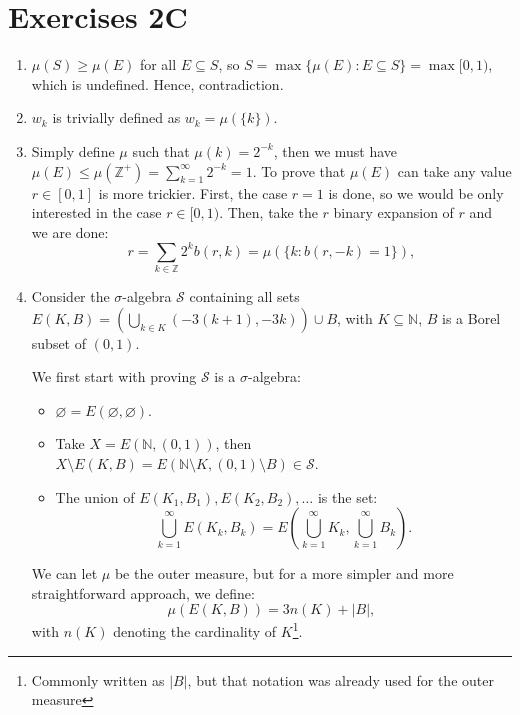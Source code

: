 
\section{Exercises 2C} %
\label{sec:Exercises 2C}


\begin{enumerate}[label=\textbf{2C.\arabic*}]
  \item \( \mu (S) \ge \mu (E) \) for all \( E \subseteq S \), so \( S = \max
    \{\mu (E): E \subseteq S\} = \max [0, 1)  \), which is undefined. Hence,
    contradiction.
  \item \( w_{k} \) is trivially defined as \( w_{k} = \mu (\{k\}  ) \).
  \item \label{2C3} Simply define \( \mu \) such that \( \mu (k) = 2^{-k} \), then we
    must have \( \mu (E) \le \mu (\mathbb{Z}^{+}) = \sum_{k = 1}^{\infty} 2^{-k}
    = 1\). To prove that \( \mu (E) \) can take any value \( r \in [0, 1] \) is
    more trickier. First, the case \( r = 1 \) is done, so we would be only
    interested in the case \( r \in [0, 1) \). Then, take the \( r \) binary
    expansion of \( r \) and we are done:
    \[
      r = \sum_{k \in \mathbb{Z}} 2^{k}b(r, k) = \mu (\{k: b(r, -k) = 1\}  )  
    ,\]
  \item Consider the \( \sigma \)-algebra \( \mathcal{S} \) containing all sets
    \( E(K, B) = \left(   \bigcup_{k \in K} (-3(k + 1), -3k) \right) \cup B \),
    with \( K \subseteq \mathbb{N} \), \( B \) is a Borel subset of \( (0, 1)
    \). 

    We first start with proving \( \mathcal{S} \) is a \( \sigma \)-algebra:
    \begin{itemize}
    \item \( \varnothing = E(\varnothing, \varnothing) \).
    \item Take \( X = E(\mathbb{N}, (0, 1)) \), then \( X \setminus E(K, B) =
      E(\mathbb{N} \setminus K, (0, 1) \setminus B) \in \mathcal{S}\).
    \item The union of \( E(K_{1}, B_{1}), E(K_{2}, B_{2}), \ldots  \) is the
      set:
      \[
        \bigcup_{k = 1}^{\infty} E(K_{k}, B_{k}) = E \left( \bigcup_{k =
      1}^{\infty} K_{k}, \bigcup_{k = 1}^{\infty} B_{k} \right)
      .\]
    \end{itemize}

    We can let \( \mu  \) be the outer measure, but for a more simpler and more
    straightforward approach, we define:
    \[
      \mu (E(K, B)) = 3n(K) + |B|
    ,\] with \( n(K) \) denoting the cardinality of \( K \)\footnote{Commonly
    written as \( |B| \), but that notation was already used for the outer
  measure}.


\end{enumerate}
